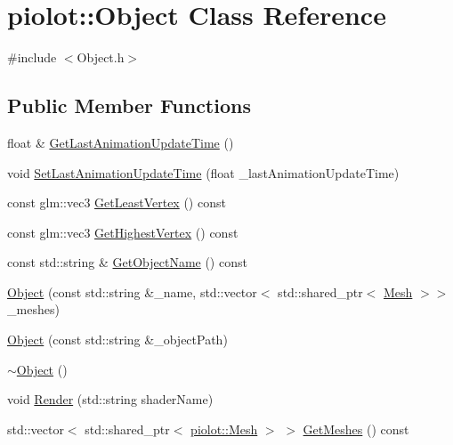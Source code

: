 \hypertarget{classpiolot_1_1_object}{}\section{piolot\+:\+:Object Class Reference}
\label{classpiolot_1_1_object}


{\ttfamily \#include $<$Object.\+h$>$}

\subsection*{Public Member Functions}
\begin{DoxyCompactItemize}
\item 
float \& \mbox{\hyperlink{classpiolot_1_1_object_ab948ad199b42e7182b6bc4b21cd68d9b}{Get\+Last\+Animation\+Update\+Time}} ()
\item 
void \mbox{\hyperlink{classpiolot_1_1_object_a39a9f4b026f1e1d97cde05b131fd56d8}{Set\+Last\+Animation\+Update\+Time}} (float \+\_\+last\+Animation\+Update\+Time)
\item 
const glm\+::vec3 \mbox{\hyperlink{classpiolot_1_1_object_a5539388d51bad81ce2e253122c02b0ef}{Get\+Least\+Vertex}} () const
\item 
const glm\+::vec3 \mbox{\hyperlink{classpiolot_1_1_object_ac7704fb8d510eb5a4f02d7cbe6eced9f}{Get\+Highest\+Vertex}} () const
\item 
const std\+::string \& \mbox{\hyperlink{classpiolot_1_1_object_a592cb508bd914b41bff868e2a9b648f5}{Get\+Object\+Name}} () const
\item 
\mbox{\hyperlink{classpiolot_1_1_object_a05e280baf87f9780e5de1c24849b862c}{Object}} (const std\+::string \&\+\_\+name, std\+::vector$<$ std\+::shared\+\_\+ptr$<$ \mbox{\hyperlink{classpiolot_1_1_mesh}{Mesh}} $>$$>$ \+\_\+meshes)
\item 
\mbox{\hyperlink{classpiolot_1_1_object_add3cd7bb280395a43069e872b384ac97}{Object}} (const std\+::string \&\+\_\+object\+Path)
\item 
\mbox{\hyperlink{classpiolot_1_1_object_ad6983e37a5ffc74726c4605454643f23}{$\sim$\+Object}} ()
\item 
void \mbox{\hyperlink{classpiolot_1_1_object_aac452c0e8843e6a1bc64b4e7eae031cf}{Render}} (std\+::string shader\+Name)
\item 
std\+::vector$<$ std\+::shared\+\_\+ptr$<$ \mbox{\hyperlink{classpiolot_1_1_mesh}{piolot\+::\+Mesh}} $>$ $>$ \mbox{\hyperlink{classpiolot_1_1_object_ab3126fb80869e1a5b02ef43eb27e69ce}{Get\+Meshes}} () const
$$
\end{DoxyCompactItemize}
